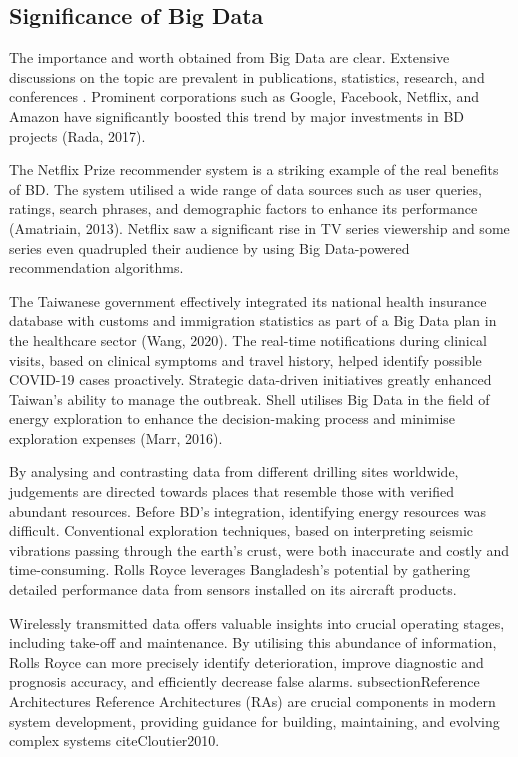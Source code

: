 \documentclass[journal]{IEEEtran}
\begin{document}
\subsection{Significance of Big Data}\label{sec:The Value of Big Data} 

The importance and worth obtained from Big Data are clear. Extensive discussions on the topic are prevalent in publications, statistics, research, and conferences \cite{Chen2012}. Prominent corporations such as Google, Facebook, Netflix, and Amazon have significantly boosted this trend by major investments in BD projects (Rada, 2017). 

The Netflix Prize recommender system is a striking example of the real benefits of BD. The system utilised a wide range of data sources such as user queries, ratings, search phrases, and demographic factors to enhance its performance (Amatriain, 2013). Netflix saw a significant rise in TV series viewership and some series even quadrupled their audience by using Big Data-powered recommendation algorithms. 

The Taiwanese government effectively integrated its national health insurance database with customs and immigration statistics as part of a Big Data plan in the healthcare sector (Wang, 2020). The real-time notifications during clinical visits, based on clinical symptoms and travel history, helped identify possible COVID-19 cases proactively. Strategic data-driven initiatives greatly enhanced Taiwan's ability to manage the outbreak. Shell utilises Big Data in the field of energy exploration to enhance the decision-making process and minimise exploration expenses (Marr, 2016). 

By analysing and contrasting data from different drilling sites worldwide, judgements are directed towards places that resemble those with verified abundant resources. Before BD's integration, identifying energy resources was difficult. Conventional exploration techniques, based on interpreting seismic vibrations passing through the earth's crust, were both inaccurate and costly and time-consuming. Rolls Royce leverages Bangladesh's potential by gathering detailed performance data from sensors installed on its aircraft products. 

Wirelessly transmitted data offers valuable insights into crucial operating stages, including take-off and maintenance. By utilising this abundance of information, Rolls Royce can more precisely identify deterioration, improve diagnostic and prognosis accuracy, and efficiently decrease false alarms. subsectionReference Architectures Reference Architectures (RAs) are crucial components in modern system development, providing guidance for building, maintaining, and evolving complex systems citeCloutier2010. 
\end{document}
